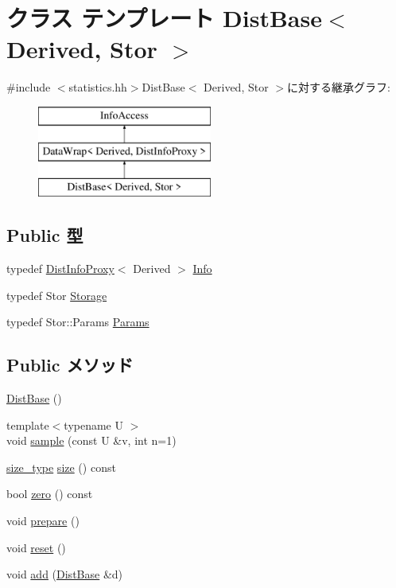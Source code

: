 \hypertarget{classStats_1_1DistBase}{
\section{クラス テンプレート DistBase$<$ Derived, Stor $>$}
\label{classStats_1_1DistBase}
}


{\ttfamily \#include $<$statistics.hh$>$}DistBase$<$ Derived, Stor $>$に対する継承グラフ:\begin{figure}[H]
\begin{center}
\leavevmode
\includegraphics[height=3cm]{classStats_1_1DistBase}
\end{center}
\end{figure}
\subsection*{Public 型}
\begin{DoxyCompactItemize}
\item 
typedef \hyperlink{classStats_1_1DistInfoProxy}{DistInfoProxy}$<$ Derived $>$ \hyperlink{classStats_1_1DistBase_a6c7ed3194655a4ace77fb6881fee9f69}{Info}
\item 
typedef Stor \hyperlink{classStats_1_1DistBase_a5d4a6db0e7c32292f54a08d05c671bd1}{Storage}
\item 
typedef Stor::Params \hyperlink{classStats_1_1DistBase_a24c5f88dc162c95e0b32ade67a7ea674}{Params}
\end{DoxyCompactItemize}
\subsection*{Public メソッド}
\begin{DoxyCompactItemize}
\item 
\hyperlink{classStats_1_1DistBase_adb664a2a3175d8daac67eb46c27d8528}{DistBase} ()
\item 
{\footnotesize template$<$typename U $>$ }\\void \hyperlink{classStats_1_1DistBase_afed4e1e09f566c5aa9e972d8c17b5a27}{sample} (const U \&v, int n=1)
\item 
\hyperlink{namespaceStats_ada51e68d31936547d3729c82daf6b7c6}{size\_\-type} \hyperlink{classStats_1_1DistBase_a503ab01f6c0142145d3434f6924714e7}{size} () const 
\item 
bool \hyperlink{classStats_1_1DistBase_a4e72b01b727d3165e75cba84eb507491}{zero} () const 
\item 
void \hyperlink{classStats_1_1DistBase_a1825b40ca3bc3a1ba67fdb58fac5015c}{prepare} ()
\item 
void \hyperlink{classStats_1_1DistBase_ad20897c5c8bd47f5d4005989bead0e55}{reset} ()
\item 
void \hyperlink{classStats_1_1DistBase_ac09dc41d5446f9395c5e4426eee18c17}{add} (\hyperlink{classStats_1_1DistBase}{DistBase} \&d)
\end{DoxyCompactItemize}
